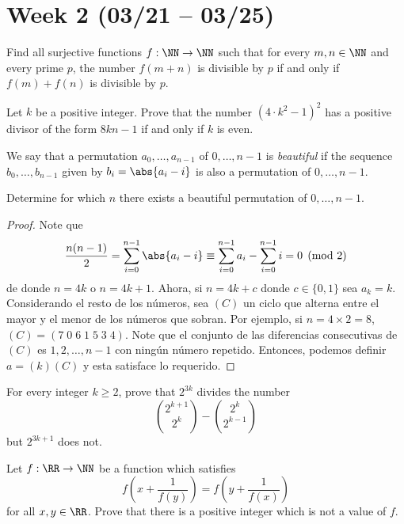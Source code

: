 \section{Week 2 (03/21 -- 03/25)}

\begin{problem}
	Find all surjective functions $f:\NN\to\NN$ such that for every $m,n\in\NN$ and every prime $p$, the number $f(m+n)$ is divisible by $p$ if and only if $f(m)+f(n)$ is divisible by $p$.
\end{problem}

\begin{problem}
	Let $k$ be a positive integer. Prove that the number $(4\cdot k^2-1)^2$ has a positive divisor of the form $8kn-1$ if and only if $k$ is even.
\end{problem}

\begin{probER}
	We say that a permutation $a_0,\dots,a_{n-1}$ of $0,\dots,n-1$ is \emph{beautiful} if the sequence $b_0,\dots,b_{n-1}$ given by $b_i=\abs{a_i-i}$ is also a permutation of $0,\dots,n-1$.

	Determine for which $n$ there exists a beautiful permutation of $0,\dots,n-1$.
\end{probER}

\begin{proof}
	Note que
	\[\frac{n(n-1)}{2}=\sum_{i=0}^{n-1}\abs{a_i-i}\equiv\sum_{i=0}^{n-1}a_i-\sum_{i=0}^{n-1}i=0\pmod 2\]
	de donde $n=4k$ o $n=4k+1$. Ahora, si $n=4k+c$ donde $c\in\{0,1\}$ sea $a_k=k$. Considerando el resto de los números, sea $(C)$ un ciclo que alterna entre el mayor y el menor de los números que sobran. Por ejemplo, si $n=4\times 2=8$, $(C)=(7\;0\;6\;1\;5\;3\;4)$. Note que el conjunto de las diferencias consecutivas de $(C)$ es $1,2,\dots,n-1$ con ningún número repetido. Entonces, podemos definir $a=(k)(C)$ y esta satisface lo requerido.
\end{proof}

\begin{problem}
	For every integer $k\ge 2$, prove that $2^{3k}$ divides the number
	\[\binom{2^{k+1}}{2^k}-\binom{2^k}{2^{k-1}}\]
	but $2^{3k+1}$ does not.
\end{problem}

\begin{problem}
	Let $f:\RR\to\NN$ be a function which satisfies
	\[f\left(x+\frac{1}{f(y)}\right)=f\left(y+\frac{1}{f(x)}\right)\]
	for all $x,y\in\RR$. Prove that there is a positive integer which is not a value of $f$.
\end{problem}

